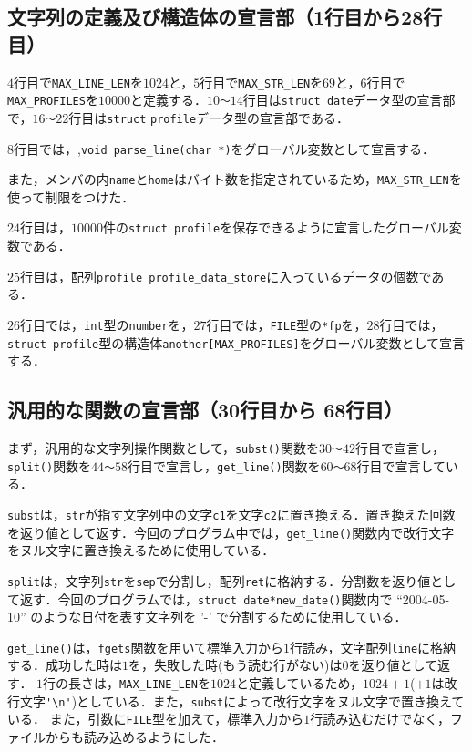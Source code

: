 \documentclass[a4j,11pt]{jarticle}
\begin{document}
\subsection{文字列の定義及び構造体の宣言部（1行目から28行目）}
$4$行目で\verb|MAX_LINE_LEN|を$1024$と，$5$行目で\verb|MAX_STR_LEN|を$69$と，$6$行目で\verb|MAX_PROFILES|を$10000$と定義する．$10$\verb|～|$14$行目は\verb|struct date|データ型の宣言部で，$16$\verb|～|$22$行目は\verb|struct| \verb|profile|データ型の宣言部である．

$8$行目では，,\verb|void parse_line(char *)|をグローバル変数として宣言する．

また，メンバの内\verb|name|と\verb|home|はバイト数を指定されているため，\verb|MAX_STR_LEN|を使って制限をつけた．

$24$行目は，$10000$件の\verb|struct profile|を保存できるように宣言したグローバル変数である．

$25$行目は，配列\verb|profile profile_data_store|に入っているデータの個数である．

$26$行目では，\verb|int|型の\verb|number|を，$27$行目では，\verb|FILE|型の\verb|*fp|を，$28$行目では，\verb|struct profile|型の構造体\verb|another[MAX_PROFILES]|をグローバル変数として宣言する．

\subsection{汎用的な関数の宣言部（30行目から 68行目）}
まず，汎用的な文字列操作関数として，\verb|subst()|関数を$30$\verb|～|$42$行目で宣言し，\verb|split()|関数を$44$\verb|～|$58$行目で宣言し，\verb|get_line()|関数を$60$\verb|～|$68$行目で宣言している．

\verb|subst|は，\verb|str|が指す文字列中の文字\verb|c1|を文字\verb|c2|に置き換える．置き換えた回数を返り値として返す．今回のプログラム中では，\verb|get_line()|関数内で改行文字をヌル文字に置き換えるために使用している．

\verb|split|は，文字列\verb|str|を\verb|sep|で分割し，配列\verb|ret|に格納する．分割数を返り値として返す．今回のプログラムでは，\verb|struct date*new_date()|関数内で ``2004-05-10'' のような日付を表す文字列を '-' で分割するために使用している．

\verb|get_line()|は，\verb|fgets|関数を用いて標準入力から$1$行読み，文字配列\verb|line|に格納する．成功した時は$1$を，失敗した時(もう読む行がない)は$0$を返り値として返す．
$1$行の長さは，\verb|MAX_LINE_LEN|を$1024$と定義しているため，$1024+1$($+1$は改行文字\verb|'\n'|)としている．また，\verb|subst|によって改行文字をヌル文字で置き換えている．
また，引数に\verb|FILE|型を加えて，標準入力から$1$行読み込むだけでなく，ファイルからも読み込めるようにした．
\end{document}
